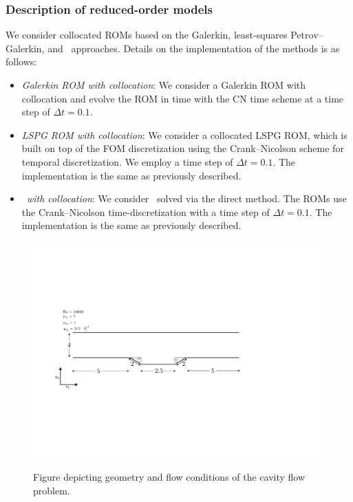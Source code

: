 \subsubsection{Description of reduced-order models}
We consider collocated ROMs based on the Galerkin, least-squares Petrov--Galerkin, and \methodAcronym\ approaches. Details on the implementation of the methods is as follows:
\begin{itemize}
\item \textit{Galerkin ROM with collocation}: We consider a Galerkin ROM with collocation and evolve the ROM in time with the CN time scheme at a time step of $\Delta t =0.1$.

\item \textit{LSPG ROM with collocation}: We consider a collocated LSPG ROM, which is built on top of the FOM discretization using the Crank--Nicolson scheme for temporal 
discretization. We employ a time step of $\Delta t  = 0.1$. The implementation is the same as previously described. 
 
\item \textit{\methodAcronymROMs\ with collocation}: We consider \methodAcronymROMs\ solved via the direct method. The ROMs use the Crank--Nicolson time-discretization with a time step of 
$\Delta t = 0.1$. The implementation is the same as previously described. 
\end{itemize}


\begin{figure}
\begin{center}
\includegraphics[trim={2cm 7cm 4cm 6cm},clip,width=0.95\linewidth]{cav_fig.pdf}
\caption{Figure depicting geometry and flow conditions of the cavity flow problem.} 
\label{fig:cav_fig}
\end{center}
\end{figure}

